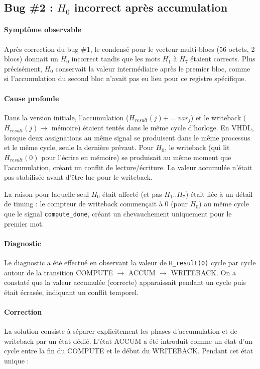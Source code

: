 \subsection{Bug \#2 : $H_0$ incorrect après accumulation}

\paragraph{Symptôme observable} Après correction du bug \#1, le condensé pour le vecteur multi-blocs (56 octets, 2 blocs) donnait un $H_0$ incorrect tandis que les mots $H_1$ à $H_7$ étaient corrects. Plus précisément, $H_0$ conservait la valeur intermédiaire après le premier bloc, comme si l'accumulation du second bloc n'avait pas eu lieu pour ce registre spécifique.

\paragraph{Cause profonde} Dans la version initiale, l'accumulation ($H_{result}(j) += var_j$) et le writeback ($H_{result}(j) \rightarrow$ mémoire) étaient tentés dans le même cycle d'horloge. En VHDL, lorsque deux assignations au même signal se produisent dans le même processus et le même cycle, seule la dernière prévaut. Pour $H_0$, le writeback (qui lit $H_{result}(0)$ pour l'écrire en mémoire) se produisait au même moment que l'accumulation, créant un conflit de lecture/écriture. La valeur accumulée n'était pas stabilisée avant d'être lue pour le writeback.

La raison pour laquelle seul $H_0$ était affecté (et pas $H_1..H_7$) était liée à un détail de timing : le compteur de writeback commençait à 0 (pour $H_0$) au même cycle que le signal \texttt{compute\_done}, créant un chevauchement uniquement pour le premier mot.

\paragraph{Diagnostic} Le diagnostic a été effectué en observant la valeur de \texttt{H\_result(0)} cycle par cycle autour de la transition COMPUTE $\rightarrow$ ACCUM $\rightarrow$ WRITEBACK. On a constaté que la valeur accumulée (correcte) apparaissait pendant un cycle puis était écrasée, indiquant un conflit temporel.

\paragraph{Correction} La solution consiste à séparer explicitement les phases d'accumulation et de writeback par un état dédié. L'état ACCUM a été introduit comme un état d'un cycle entre la fin du COMPUTE et le début du WRITEBACK. Pendant cet état unique :

